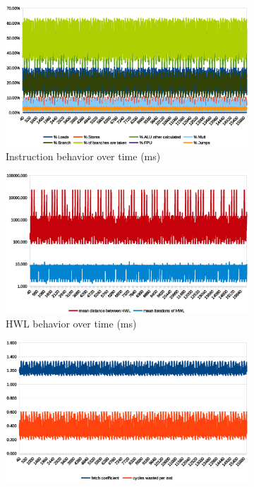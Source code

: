 \documentclass[../bachelor_paper.tex]{subfiles}
\begin{document}
\begin{figure}
    \begin{subfigure}{\textwidth}
        \centering
        \includegraphics[height=0.26\textheight]{img/graph/coremark/coremark_inst.eps}
        \caption{Instruction behavior over time (ms)}
        \label{fig:res/coremark/inst}
    \end{subfigure}
    \begin{subfigure}{\textwidth}
        \centering
        \includegraphics[height=0.26\textheight]{img/graph/coremark/coremark_hwl.eps}
        \caption{\ac{HWL} behavior over time (ms)}
        \label{fig:res/coremark/hwl}
    \end{subfigure}
    \begin{subfigure}{\textwidth}
        \centering
        \includegraphics[height=0.26\textheight]{img/graph/coremark/coremark_fetch_waste.eps}

\end{subfigure}
\end{figure}
\end{document}
